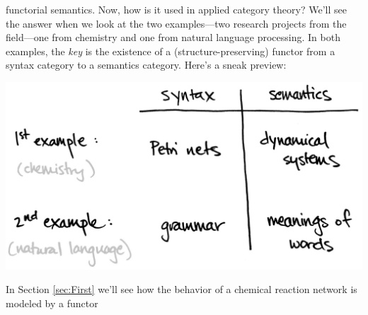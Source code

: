 \documentclass{tufte-handout-tai}
\newcounter{dummy} %
\theoremstyle{plain}
\theoremstyle{definition}
\theoremstyle{remark}
\begin{document}
 functorial semantics. Now, how is it used in applied category theory? We'll see the answer when we look at the two examples---two research projects from the field---one from chemistry and one from natural language processing. In both examples, the \textit{key} is the existence of a (structure-preserving) functor from a syntax category to a semantics category. Here's a sneak preview: 
\vspace{0.3cm}
\begin{center}
\label{fig:4cats}
\includegraphics[width=!,totalheight=!,scale=0.45]{ss.jpg}
\end{center}
\vspace{0.1cm}
In Section \ref{sec:First} we'll see how the behavior of a chemical reaction network is modeled by a functor
\end{document}
